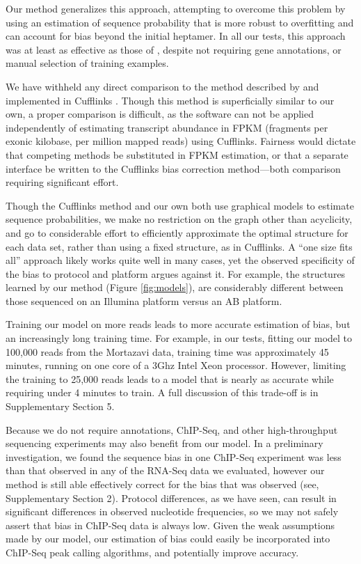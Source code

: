 \documentclass{bioinfo}
\begin{document}
Our method generalizes this approach, attempting to overcome this problem by
using an estimation of sequence probability that is more robust to overfitting
and can account for bias beyond the initial heptamer. In all our tests, this
approach was at least as effective as those of \citet{Li2010}, despite not
requiring gene annotations, or manual selection of training examples.

We have withheld any direct comparison to the method described by
\citet{Roberts2011} and implemented in Cufflinks \citep{Trapnell2010}. Though
this method is superficially similar to our own, a proper comparison is
difficult, as the software can not be applied independently of estimating
transcript abundance in FPKM (fragments per exonic kilobase, per million mapped
reads) using Cufflinks. Fairness would dictate that competing methods be
substituted in FPKM estimation, or that a separate interface be written to the
Cufflinks bias correction method---both comparison requiring significant effort.

Though the Cufflinks method and our own both use graphical models to estimate
sequence probabilities, we make no restriction on the graph other than
acyclicity, and go to considerable effort to efficiently approximate the optimal
structure for each data set, rather than using a fixed structure, as in
Cufflinks. A ``one size fits all'' approach likely works quite well in many
cases, yet the observed specificity of the bias to protocol and platform argues
against it. For example, the structures learned by our method (Figure
\ref{fig:models}), are considerably different between those sequenced on an
Illumina platform versus an AB platform.

Training our model on more reads leads to more accurate estimation of bias, but
an increasingly long training time. For example, in our tests, fitting our model to
100,000 reads from the Mortazavi data, training time was approximately 45
minutes, running on one core of a 3Ghz Intel Xeon processor. However, limiting
the training to 25,000 reads leads to a model that is nearly as accurate while
requiring under 4 minutes to train. A full discussion of this trade-off is in
Supplementary Section 5.


Because we do not require annotations, ChIP-Seq, and other high-throughput
sequencing experiments may also benefit from our model. In a preliminary
investigation, we found the sequence bias in one ChIP-Seq experiment
\cite{Cao2010} was less than that observed in any of the RNA-Seq data we
evaluated, however our method is still able effectively correct for the bias
that was observed (see, Supplementary Section 2).
Protocol differences, as we have seen,
can result in significant differences in observed nucleotide frequencies, so we
may not safely assert that bias in ChIP-Seq data is always low.  Given the weak
assumptions made by our model, our estimation of bias could easily be
incorporated into ChIP-Seq peak calling algorithms, and potentially improve
accuracy.
\end{document}
